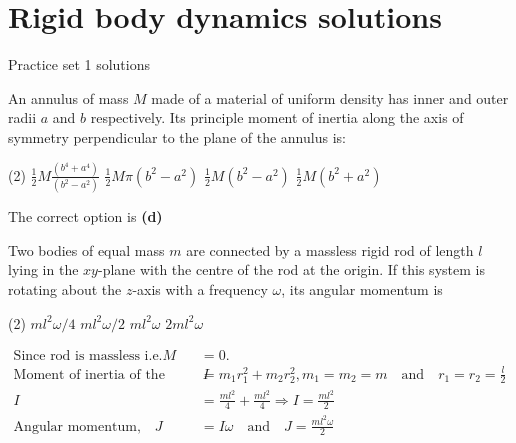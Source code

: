 \chapter{Rigid body dynamics solutions}
\begin{abox}
	Practice set 1 solutions
	\end{abox}
\begin{enumerate}
\begin{minipage}{\textwidth}
\item An annulus of mass $M$ made of a material of uniform density has inner and outer radii $a$ and $b$ respectively. Its principle moment of inertia along the axis of symmetry perpendicular to the plane of the annulus is:
\end{minipage}
\begin{tasks}(2)
	\task[\textbf{A.}] $\frac{1}{2} M \frac{\left(b^{4}+a^{4}\right)}{\left(b^{2}-a^{2}\right)}$
	\task[\textbf{B.}]$\frac{1}{2} M \pi\left(b^{2}-a^{2}\right)$
	\task[\textbf{C.}]$\frac{1}{2} M\left(b^{2}-a^{2}\right)$
	\task[\textbf{D.}]$\frac{1}{2} M\left(b^{2}+a^{2}\right)$
\end{tasks}
\begin{answer}
	The correct option is \textbf{(d)}
\end{answer}
\begin{minipage}{\textwidth}
	\item Two bodies of equal mass $m$ are connected by a massless rigid rod of length $l$ lying in the $x y$-plane with the centre of the rod at the origin. If this system is rotating about the $z$-axis with a frequency $\omega$, its angular momentum is
\end{minipage}
\begin{tasks}(2)
	\task[\textbf{A.}] $m l^{2} \omega / 4$
	\task[\textbf{B.}]$m l^{2} \omega / 2$
	\task[\textbf{C.}]$m l^{2} \omega$
	\task[\textbf{D.}]$2 m l^{2} \omega$
\end{tasks}
\begin{answer}
 \begin{align*}
 \text{Since rod is massless i.e}. M&=0.\\
 \text{Moment of inertia of the system} \quad I&=m_{1} r_{1}^{2}+m_{2} r_{2}^{2}, m_{1}=m_{2}=m \quad \text{and} \quad r_{1}=r_{2}=\frac{l}{2}\\
 I&=\frac{m l^{2}}{4}+\frac{m l^{2}}{4} \Rightarrow I=\frac{m l^{2}}{2}\\
 \text{Angular momentum,} \quad J&=I \omega \quad \text{and} \quad J=\frac{m l^{2} \omega}{2}

\end{align*}
\end{answer}
\end{enumerate}
